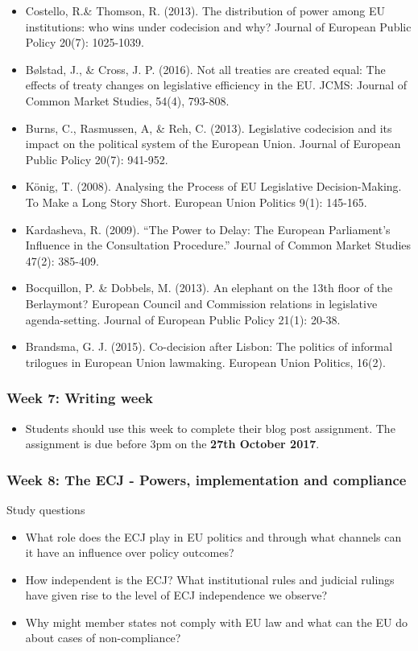 \begin{itemize}
    \item Costello, R.\& Thomson, R. (2013). The distribution of power among EU institutions: who wins under codecision and why? Journal of European Public Policy 20(7): 1025-1039.
	\item B{\o}lstad, J., \& Cross, J. P. (2016). Not all treaties are created equal: The effects of treaty changes on legislative efficiency in the EU. JCMS: Journal of Common Market Studies, 54(4), 793-808.
    \item Burns, C., Rasmussen, A, \& Reh, C. (2013). Legislative codecision and its impact on the political system of the European Union. Journal of European Public Policy 20(7): 941-952.
    \item K{\"o}nig, T. (2008). Analysing the Process of EU Legislative Decision-Making. To Make a Long Story Short. European Union Politics 9(1): 145-165.
    \item Kardasheva, R. (2009). “The Power to Delay: The European Parliament's Influence in the Consultation Procedure.” Journal of Common Market Studies 47(2): 385-409.
    \item Bocquillon, P. \& Dobbels, M. (2013). An elephant on the 13th floor of the Berlaymont? European Council and Commission relations in legislative agenda-setting. Journal of European Public Policy 21(1): 20-38.
	\item Brandsma, G. J. (2015). Co-decision after Lisbon: The politics of informal trilogues in European Union lawmaking. European Union Politics, 16(2).
\end{itemize}


\subsubsection*{Week 7: Writing week}

\begin{itemize}
	\item Students should use this week to complete their blog post assignment. The assignment is due before 3pm on the \textbf{27th October 2017}.
\end{itemize}

\subsubsection*{Week 8: The ECJ - Powers, implementation and compliance}

Study questions

\begin{itemize}
	\item What role does the ECJ play in EU politics and through what channels can it have an influence over policy outcomes?
	\item How independent is the ECJ? What institutional rules and judicial rulings have given rise to the level of ECJ independence we observe?
	\item Why might member states not comply with EU law and what can the EU do about cases of non-compliance?
\end{itemize}

